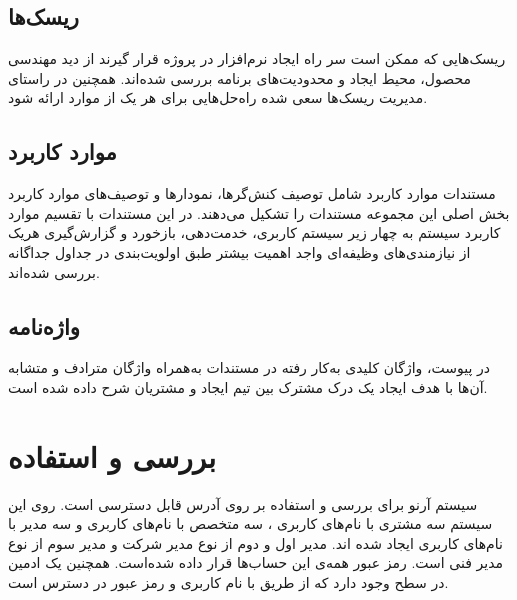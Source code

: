 \subsection{ریسک‌ها}
ریسک‌هایی که ممکن است سر راه ایجاد نرم‌افزار در پروژه قرار گیرند از دید مهندسی محصول، محیط ایجاد و محدودیت‌های برنامه بررسی شده‌اند. همچنین در راستای مدیریت ریسک‌ها سعی شده راه‌حل‌هایی برای هر یک از موارد ارائه شود.
\subsection{موارد کاربرد}
مستندات موارد کاربرد شامل توصیف کنش‌گرها، نمودارها و توصیف‌های موارد کاربرد بخش اصلی این مجموعه مستندات را تشکیل می‌دهند. در این مستندات با تقسیم موارد کاربرد سیستم به چهار زیر سیستم کاربری، خدمت‌دهی، بازخورد و گزارش‌گیری هریک از نیازمندی‌های وظیفه‌ای واجد اهمیت بیشتر طبق اولویت‌بندی در جداول جداگانه بررسی شده‌اند.
\subsection{واژه‌نامه}
در پیوست، واژگان کلیدی به‌کار رفته در مستندات به‌همراه واژگان مترادف و متشابه آن‌ها با هدف ایجاد یک درک مشترک بین تیم ایجاد و مشتریان شرح داده شده است.

\section{بررسی و استفاده}
سیستم آرنو برای بررسی و استفاده بر روی آدرس \href{http://arno.mostafaojaghi.ir}{} قابل دسترسی است.
روی این سیستم سه مشتری با نام‌های کاربری ، سه متخصص با نام‌های کاربری  و سه مدیر با نام‌های کاربری  ایجاد شده اند.
مدیر اول و دوم از نوع مدیر شرکت و مدیر سوم از نوع مدیر فنی است.
رمز عبور همه‌ی این حساب‌ها  قرار داده شده‌است.
همچنین یک ادمین در سطح  وجود دارد که از طریق \href{http://arno.mostafaojaghi.ir/admin}{} با نام کاربری  و رمز عبور  در دسترس است.